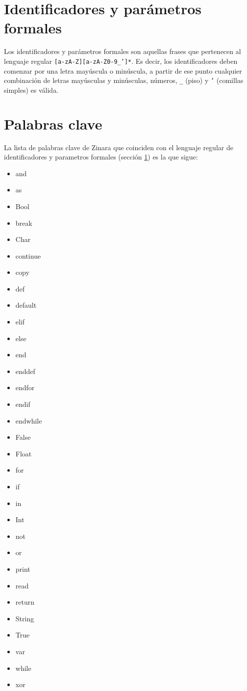 \documentclass[12pt, spanish]{report}
\begin{document}
\section{Identificadores y par\'ametros formales}
\label{sec:ident}
Los identificadores y par\'ametros formales son aquellas frases que
pertenecen al lenguaje regular \texttt{[a-zA-Z][a-zA-Z0-9\_']*}. Es
decir, los identificadores deben comenzar por una letra may\'uscula o
min\'uscula, a partir de ese punto cualquier combinaci\'on de letras
may\'usculas y min\'usculas, n\'umeros, \texttt{\_} (piso) y
\texttt{'} (comillas simples) es v\'alida.

\section{Palabras clave}
\label{sec:keywords}
La lista de palabras clave de Zinara que coinciden con el lenguaje regular
de identificadores y parametros formales (secci\'on \ref{sec:ident}) es la que sigue:
\begin{itemize}
\item and
\item as
\item Bool
\item break
\item Char
\item continue
\item copy
\item def
\item default
\item elif
\item else
\item end
\item enddef
\item endfor
\item endif
\item endwhile
\item False
\item Float
\item for
\item if
\item in
\item Int
\item not
\item or
\item print
\item read
\item return
\item String
\item True
\item var
\item while
\item xor
\end{itemize}
\end{document}
